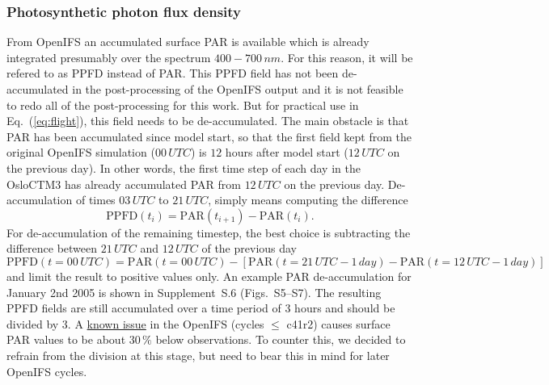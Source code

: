 \documentclass[gmd, manuscript]{copernicus}
\begin{document}
\subsubsection{Photosynthetic photon flux density}
From OpenIFS an accumulated surface PAR is available which is already integrated presumably over the spectrum $400-700\,\unit{nm}$. For this reason, it will be refered to as PPFD instead of PAR. This PPFD field has not been de-accumulated in the post-processing of the OpenIFS output and it is not feasible to redo all of the post-processing for this work. But for practical use in Eq.~(\ref{eq:flight}), this field needs to be de-accumulated. The main obstacle is that PAR has been accumulated since model start, so that the first field kept from the original OpenIFS simulation ($00\,\unit{UTC}$) is $12$ hours after model start ($12\,\unit{UTC}$ on the previous day). In other words, the first time step of each day in the OsloCTM3 has already accumulated PAR from $12\,\unit{UTC}$ on the previous day.
De-accumulation of times $03\,\unit{UTC}$ to $21\,\unit{UTC}$, simply means computing the difference
\begin{equation}
  \text{PPFD}(t_i) = \text{PAR}(t_{i+1})-\text{PAR}(t_i).
\end{equation}
For de-accumulation of the remaining timestep, the best choice is subtracting the difference between $21\,\unit{UTC}$ and $12\,\unit{UTC}$ of the previous day
%
\begin{equation}
  \text{PPFD}(t=00\,\unit{UTC}) = \text{PAR}(t=00\,\unit{UTC}) - \left[\text{PAR}(t=21\,\unit{UTC}-1\,\unit{day})-\text{PAR}(t=12\,\unit{UTC}-1\,\unit{day})\right]
\end{equation}
%
and limit the result to positive values only. An example PAR de-accumulation for January 2nd 2005 is shown in Supplement~S.6 (Figs.~S5--S7).
The resulting PPFD fields are still accumulated over a time period of $3$ hours and should be divided by $3$. A \href{https://confluence.ecmwf.int/display/CKB/ERA-Interim\%3A+surface+photosynthetically+active+radiation+\%28surface+PAR\%29+values+are+too+low}{known issue} in the OpenIFS (cycles $\le$ c41r2) causes surface PAR values to be about $30\,\unit{\%}$ below observations. To counter this, we decided to refrain from the division at this stage, but need to bear this in mind for later OpenIFS cycles.
\end{document}
